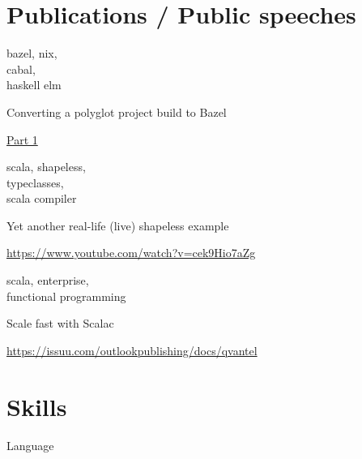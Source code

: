 \documentclass[a4paper,11pt]{cv4tw}%
\begin{document}
\section{Publications / Public speeches}
      {bazel, nix,\\cabal,\\haskell elm}
      {Converting a polyglot project build to Bazel
        \begin{missions}
          \item \href{https://www.tweag.io/blog/2022-10-20-bazel-example-servant-elm-1/}{Part 1}
        \end{missions}
      }
      {scala, shapeless,\\typeclasses,\\scala compiler}
      {Yet another real-life (live) shapeless example
        \begin{missions}
          \item \href{https://www.youtube.com/watch?v=cek9Hio7aZg}{https://www.youtube.com/watch?v=cek9Hio7aZg}
        \end{missions}
      }
      {scala, enterprise,\\functional programming}
      {Scale fast with Scalac
        \begin{missions}
          \item \href{https://issuu.com/outlookpublishing/docs/qvantel}{https://issuu.com/outlookpublishing/docs/qvantel}
        \end{missions}
      }

\section{Skills}
\begin{skills} {Language}
\end{skills}



\end{document}
